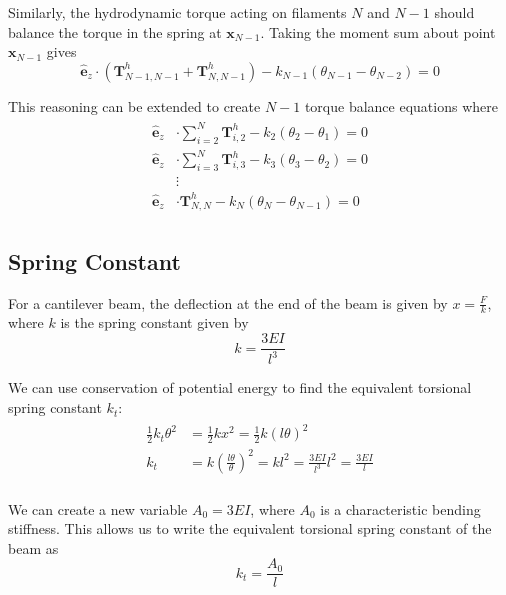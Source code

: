 \documentclass[12pt,letterpaper,titlepage]{article}
\newcommand{\uvec}[1]{\mathbf{\hat{#1}}}
\begin{document}
Similarly, the hydrodynamic torque acting on filaments $N$ and $N-1$ should balance the torque in the spring at $\mathbf{x}_{N-1}$. Taking the moment sum about point $\mathbf{x}_{N-1}$ gives
\begin{equation}
\uvec{e}_z \cdot (\mathbf{T}_{N-1,N-1}^h + \mathbf{T}_{N,N-1}^h) - k_{N-1}(\theta_{N-1} - \theta_{N-2}) = 0
\end{equation}

This reasoning can be extended to create $N-1$ torque balance equations where
\begin{align}
\begin{split}
\uvec{e}_z &\cdot \sum_{i=2}^{N} \mathbf{T}_{i,2}^h - k_2(\theta_2 - \theta_1) = 0 \\
\uvec{e}_z &\cdot \sum_{i=3}^{N} \mathbf{T}_{i,3}^h - k_3(\theta_3 - \theta_2) = 0 \\
&\vdots \\
\uvec{e}_z &\cdot \mathbf{T}_{N,N}^h - k_N(\theta_N - \theta_{N-1}) = 0
\end{split}
\end{align}

\newpage

\subsection{Spring Constant}
For a cantilever beam, the deflection at the end of the beam is given by $x = \frac{F}{k}$, where $k$ is the spring constant given by
\begin{equation}
k = \frac{3EI}{l^3}
\end{equation}

We can use conservation of potential energy to find the equivalent torsional spring constant $k_t$:
\begin{align}
\begin{split}
\frac{1}{2} k_t \theta^2 &= \frac{1}{2} k x^2 = \frac{1}{2} k (l \theta)^2 \\
k_t &= k (\frac{l \theta}{\theta})^2 = k l^2 = \frac{3EI}{l^3} l^2 = \frac{3EI}{l}\\
\end{split}
\end{align}

We can create a new variable $A_0 = 3EI$, where $A_0$ is a characteristic bending stiffness. This allows us to write the equivalent torsional spring constant of the beam as
\begin{equation}
k_t = \frac{A_0}{l}
\end{equation}
\end{document}
